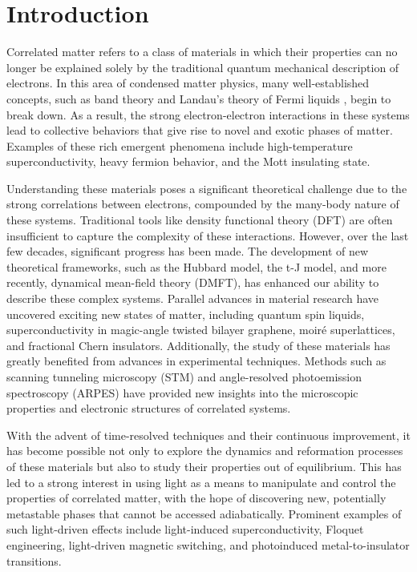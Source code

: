 \cleardoublepage
\chapter*{Introduction}


Correlated matter refers to a class of materials in which their properties can no longer be explained solely by the traditional quantum mechanical description of electrons.
In this area of condensed matter physics, many well-established concepts, such as band theory \cite{bethe_sommerfeld_bloch} and Landau’s theory of Fermi liquids \cite{landau}, begin to break down.
As a result, the strong electron-electron interactions in these systems lead to collective behaviors that give rise to novel and exotic phases of matter.
Examples of these rich emergent phenomena include high-temperature superconductivity, heavy fermion behavior, and the Mott insulating state.

Understanding these materials poses a significant theoretical challenge due to the strong correlations between electrons, compounded by the many-body nature of these systems.
Traditional tools like density functional theory (DFT) are often insufficient to capture the complexity of these interactions.
However, over the last few decades, significant progress has been made.
The development of new theoretical frameworks, such as the Hubbard model, the t-J model, and more recently, dynamical mean-field theory (DMFT), has enhanced our ability to describe these complex systems.
Parallel advances in material research have uncovered exciting new states of matter, including quantum spin liquids, superconductivity in magic-angle twisted bilayer graphene, moiré superlattices, and fractional Chern insulators.
Additionally, the study of these materials has greatly benefited from advances in experimental techniques.
Methods such as scanning tunneling microscopy (STM) and angle-resolved photoemission spectroscopy (ARPES) have provided new insights into the microscopic properties and electronic structures of correlated systems.

With the advent of time-resolved techniques and their continuous improvement, it has become possible not only to explore the dynamics and reformation processes of these materials but also to study their properties out of equilibrium.
This has led to a strong interest in using light as a means to manipulate and control the properties of correlated matter, with the hope of discovering new, potentially metastable phases that cannot be accessed adiabatically.
Prominent examples of such light-driven effects include light-induced superconductivity, Floquet engineering, light-driven magnetic switching, and photoinduced metal-to-insulator transitions.

